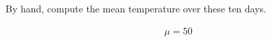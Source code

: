 By hand, compute the mean temperature over these ten days.

\begin{solution}
    \begin{align*}
        \mu = 50
    \end{align*}
\end{solution}